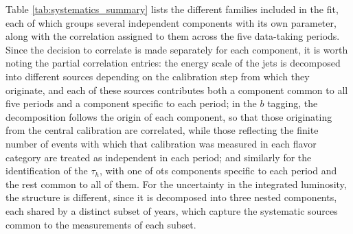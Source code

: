 


Table \ref{tab:systematics_summary} lists the different families included in the fit, each of which groups several independent components with its own parameter, along with the correlation assigned to them across the five data-taking periods. Since the decision to correlate is made separately for each component, it is worth noting the partial correlation entries: the energy scale of the jets is decomposed into different sources depending on the calibration step from which they originate, and each of these sources contributes both a component common to all five periods and a component specific to each period; in the $b$ tagging, the decomposition follows the origin of each component, so that those originating from the central calibration are correlated, while those reflecting the finite number of events with which that calibration was measured in each flavor category are treated as independent in each period; and similarly for the identification of the $\tau_h$, with one of ots components specific to each period and the rest common to all of them. For the uncertainty in the integrated luminosity, the structure is different, since it is decomposed into three nested components, each shared by a distinct subset of years, which capture the systematic sources common to the measurements of each subset.


